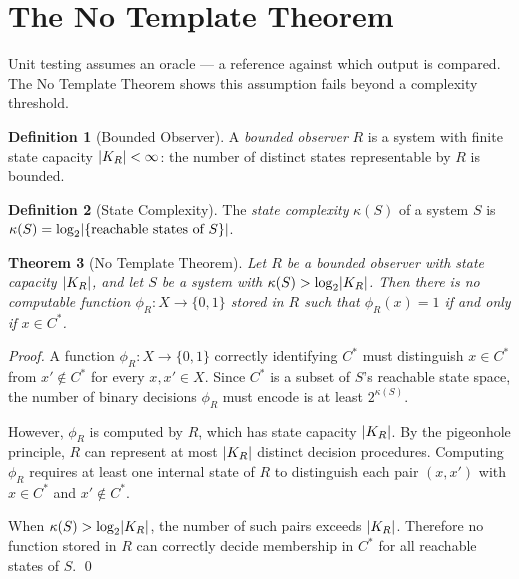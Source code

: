 \documentclass[twocolumn,a4paper,11pt]{article}
\theoremstyle{plain}
\newtheorem{theorem}{Theorem}[section]
\theoremstyle{definition}
\newtheorem{definition}[theorem]{Definition}
\theoremstyle{remark}
\DeclarePairedDelimiter{\abs}{\lvert}{\rvert}
\begin{document}
\section{The No Template Theorem}
\label{sec:no-template}

Unit testing assumes an oracle --- a reference against which output is
compared. The No Template Theorem shows this assumption fails beyond a
complexity threshold.

\begin{definition}[Bounded Observer]
\label{def:bounded-observer}
A \emph{bounded observer} $R$ is a system with finite state capacity
$\abs{K_R} < \infty$: the number of distinct states representable by
$R$ is bounded.
\end{definition}

\begin{definition}[State Complexity]
\label{def:state-complexity}
The \emph{state complexity} $\kappa(S)$ of a system $S$ is
$\kappa(S) = \log_2 \abs{\{\text{reachable states of } S\}}$.
\end{definition}

\begin{theorem}[No Template Theorem]
\label{thm:no-template}
Let $R$ be a bounded observer with state capacity $\abs{K_R}$, and let
$S$ be a system with $\kappa(S) > \log_2 \abs{K_R}$. Then there is no
computable function $\phi_R: X \to \{0,1\}$ stored in $R$ such that
$\phi_R(x) = 1$ if and only if $x \in C^*$.
\end{theorem}

\begin{proof}
A function $\phi_R: X \to \{0,1\}$ correctly identifying $C^*$ must
distinguish $x \in C^*$ from $x' \notin C^*$ for every $x, x' \in X$.
Since $C^*$ is a subset of $S$'s reachable state space, the number of
binary decisions $\phi_R$ must encode is at least $2^{\kappa(S)}$.

However, $\phi_R$ is computed by $R$, which has state capacity $\abs{K_R}$.
By the pigeonhole principle, $R$ can represent at most $\abs{K_R}$ distinct
decision procedures. Computing $\phi_R$ requires at least one internal
state of $R$ to distinguish each pair $(x, x')$ with $x \in C^*$ and
$x' \notin C^*$.

When $\kappa(S) > \log_2 \abs{K_R}$, the number of such pairs exceeds
$\abs{K_R}$. Therefore no function stored in $R$ can correctly decide
membership in $C^*$ for all reachable states of $S$. \qed
\end{proof}
\end{document}
